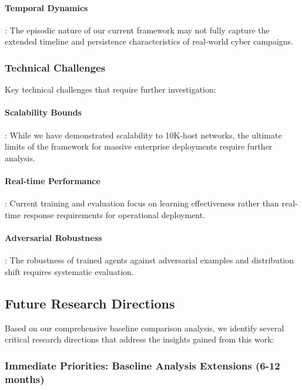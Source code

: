 \documentclass[12pt,oneside]{article}
\begin{document}
\paragraph{Temporal Dynamics}: The episodic nature of our current framework may not fully capture the extended timeline and persistence characteristics of real-world cyber campaigns.

\subsubsection{Technical Challenges}
Key technical challenges that require further investigation:

\paragraph{Scalability Bounds}: While we have demonstrated scalability to 10K-host networks, the ultimate limits of the framework for massive enterprise deployments require further analysis.

\paragraph{Real-time Performance}: Current training and evaluation focus on learning effectiveness rather than real-time response requirements for operational deployment.

\paragraph{Adversarial Robustness}: The robustness of trained agents against adversarial examples and distribution shift requires systematic evaluation.

\subsection{Future Research Directions}

Based on our comprehensive baseline comparison analysis, we identify several critical research directions that address the insights gained from this work:

\subsubsection{Immediate Priorities: Baseline Analysis Extensions (6-12 months)}
\end{document}

